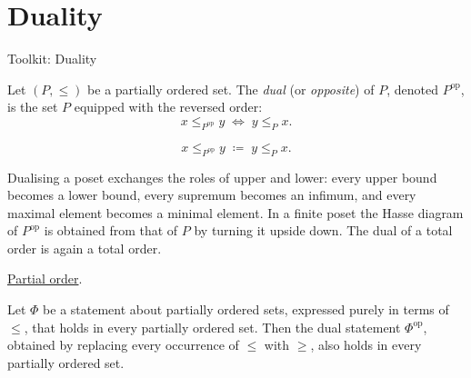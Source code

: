 
\section{Duality}
\label{sec:duality}

\begin{definitionbox}{Toolkit: Duality}
\begin{definition}
\label{def:dual-ordered-set}
Let $(P, \leq)$ be a partially ordered set.  The \emph{dual} (or
\emph{opposite}) of $P$, denoted $P^{\mathrm{op}}$, is the set $P$
equipped with the reversed order:
\[
x \leq_{P^{\mathrm{op}}} y \;\Longleftrightarrow\; y \leq_P x.
\]
\end{definition}
\end{definitionbox}

\begin{remark*}
\[
x \leq_{P^{\mathrm{op}}} y
\;\coloneqq\;
y \leq_P x.
\]
\end{remark*}

\begin{remark*}[Interpretation]
Dualising a poset exchanges the roles of upper and lower: every upper bound
becomes a lower bound, every supremum becomes an infimum, and every maximal
element becomes a minimal element.  In a finite poset the Hasse diagram of
$P^{\mathrm{op}}$ is obtained from that of $P$ by turning it upside down.
The dual of a total order is again a total order.
\end{remark*}

\begin{remark*}[Dependencies]
\hyperref[def:partial-order]{Partial order}.
\end{remark*}


\begin{proposition}
\label{prop:duality-principle}
Let $\Phi$ be a statement about partially ordered sets, expressed purely
in terms of $\leq$, that holds in every partially ordered set.  Then the
dual statement $\Phi^{\mathrm{op}}$, obtained by replacing every
occurrence of $\leq$ with $\geq$, also holds in every partially ordered
set.
\end{proposition}

